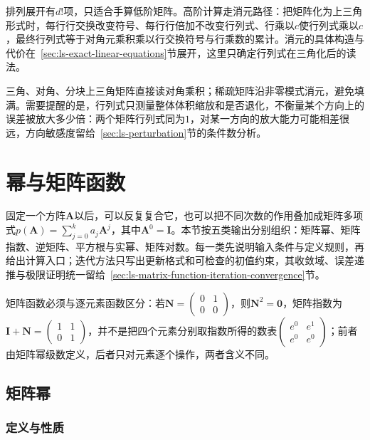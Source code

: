 排列展开有$d!$项，只适合手算低阶矩阵。高阶计算走消元路径：把矩阵化为上三角形式时，每行行交换改变符号、每行行倍加不改变行列式、行乘以$c$使行列式乘以$c$，最终行列式等于对角元乘积乘以行交换符号与行乘数的累计。消元的具体构造与代价在~\ref{sec:ls-exact-linear-equations}节展开，这里只确定行列式在三角化后的读法。

三角、对角、分块上三角矩阵直接读对角乘积；稀疏矩阵沿非零模式消元，避免填满。需要提醒的是，行列式只测量整体体积缩放和是否退化，不衡量某个方向上的误差被放大多少倍：两个矩阵行列式同为$1$，对某一方向的放大能力可能相差很远，方向敏感度留给~\ref{sec:ls-perturbation}节的条件数分析。

\section{幂与矩阵函数}
\label{sec:ls-matrix-functions}
\label{sec:matrix-analysis-functions-structured-operations}

固定一个方阵$\bm A$以后，可以反复复合它，也可以把不同次数的作用叠加成矩阵多项式$p(\bm A)=\sum_{j=0}^k a_j\bm A^j$，其中$\bm A^0=\bm I$。本节按五类输出分别组织：矩阵幂、矩阵指数、逆矩阵、平方根与实幂、矩阵对数。每一类先说明输入条件与定义规则，再给出计算入口；迭代方法只写出更新格式和可检查的初值约束，其收敛域、误差递推与极限证明统一留给~\ref{sec:ls-matrix-function-iteration-convergence}节。

矩阵函数必须与逐元素函数区分：若$\bm N=\begin{pmatrix}0&1\\0&0\end{pmatrix}$，则$\bm N^2=\bm0$，矩阵指数为$\bm I+\bm N=\begin{pmatrix}1&1\\0&1\end{pmatrix}$，并不是把四个元素分别取指数所得的数表$\begin{pmatrix}e^0&e^1\\e^0&e^0\end{pmatrix}$；前者由矩阵幂级数定义，后者只对元素逐个操作，两者含义不同。

\subsection{矩阵幂}
\label{sec:ls-matrix-powers}
\label{sec:ch06-powers-spectrum}

\subsubsection{定义与性质}

